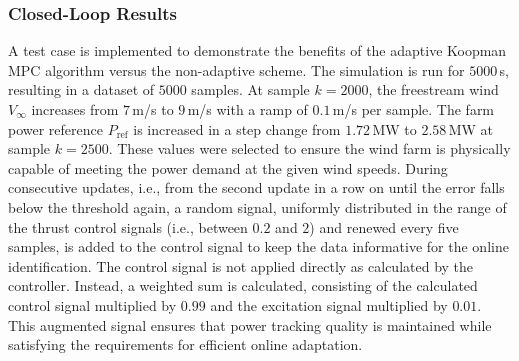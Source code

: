 \subsubsection{Closed-Loop Results}
A test case is implemented to demonstrate the benefits of the adaptive Koopman MPC algorithm versus the non-adaptive scheme. The simulation is run for $5000$\,s, resulting in a dataset of $5000$ samples. At sample $k = 2000$, the freestream wind $V_\infty$ increases from $7$\,m/s to $9$\,m/s with a ramp of $0.1$\,m/s per sample. The farm power reference $P_{\text{ref}}$ is increased in a step change from $1.72$\,MW to $2.58$\,MW at sample $k = 2500$. These values were selected to ensure the wind farm is physically capable of meeting the power demand at the given wind speeds. During consecutive updates, i.e., from the second update in a row on until the error falls below the threshold again, a random signal, uniformly distributed in the range of the thrust control signals (i.e., between $0.2$ and $2$) and renewed every five samples, is added to the control signal to keep the data informative for the online identification. The control signal is not applied directly as calculated by the controller. Instead, a weighted sum is calculated, consisting of the calculated control signal multiplied by $0.99$ and the excitation signal multiplied by $0.01$. This augmented signal ensures that power tracking quality is maintained while satisfying the requirements for efficient online adaptation.

